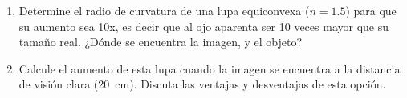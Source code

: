 \item
\begin{enumerate}
	\item Determine el radio de curvatura de una lupa equiconvexa (\(n = \num{1.5}\)) para que su aumento sea 10x, es decir que al ojo aparenta ser \num{10} veces mayor que su tamaño real.
	¿Dónde se encuentra la imagen, y el objeto?
	\item Calcule el aumento de esta lupa cuando la imagen se encuentra a la distancia de visión clara (\SI{20}{\centi\metre}).
	Discuta las ventajas y desventajas de esta opción.
\end{enumerate}
